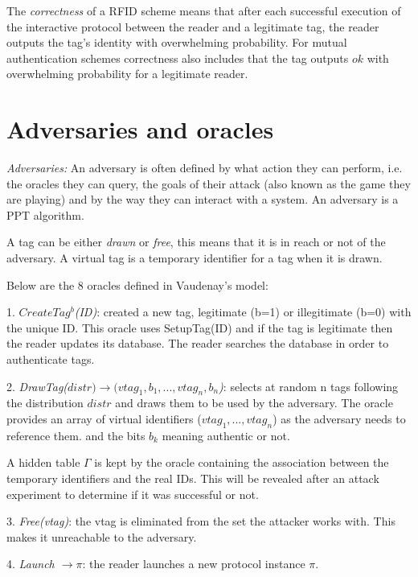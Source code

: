     The \textit{correctness} of a RFID scheme means that after each successful execution of the interactive protocol between the reader and a 
    legitimate tag, the reader outputs the tag's identity with overwhelming probability. For mutual authentication schemes correctness also includes
    that the tag outputs $ok$ with overwhelming probability for a legitimate reader.

\section{Adversaries and oracles}

    \textit{Adversaries:} An adversary is often defined by what action they can perform, i.e. the oracles they can query, 
    the goals of their attack (also known as the game they are playing) and by the way they can interact with a system. An adversary
    is a PPT algorithm.
    
    A tag can be either \textit{drawn} or \textit{free}, this means that it is in reach or not of the 
    adversary. A virtual tag is a temporary identifier for a tag when it is drawn.

    Below are the 8 oracles defined in Vaudenay's model:

    1. \textit{$CreateTag^b$(ID)}: created a new tag, legitimate (b=1) or illegitimate (b=0) with the unique ID.
        This oracle uses SetupTag(ID) and if the tag is legitimate then the reader 
        updates its database. The reader searches the database in order to authenticate tags.
    
    2. \textit{DrawTag($distr) \rightarrow (vtag_1, b_1, ... , vtag_n, b_n$)}: selects at random n tags following the 
    distribution $distr$ and draws them to be used by the adversary. The oracle provides
    an array of virtual identifiers ($vtag_1, ... ,vtag_n$) as the adversary needs to reference them.
    and the bits $b_k$ meaning authentic or not. 
    
    A hidden table $\Gamma$ is kept by the oracle containing the association between the temporary identifiers and the real IDs.
    This will be revealed after an attack experiment to determine if it was successful or not.

    3. \textit{Free(vtag)}: the vtag is eliminated from the set the attacker works with. This makes it unreachable to the adversary.
    
    4. \textit{Launch $\rightarrow \pi$}: the reader launches a new protocol instance $\pi$.

